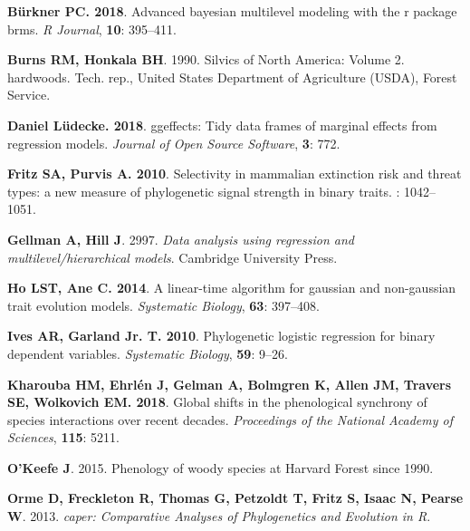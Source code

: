 \documentclass[11pt]{article}\usepackage[]{graphicx}\usepackage[]{color}
\begin{document}
{\begin{thebibliography}{20}
{\bf B{\"u}rkner PC}{\bf . 2018}.
\newblock Advanced bayesian multilevel modeling with the r package brms.
\newblock \emph{R Journal}, {\bf 10}: 395--411.

{\bf Burns RM, Honkala BH}. 1990.
\newblock Silvics of North America: Volume 2. hardwoods.
\newblock Tech. rep., United States Department of Agriculture (USDA), Forest
  Service.

{\bf {Daniel L{\"u}decke}}{\bf . 2018}.
\newblock ggeffects: Tidy data frames of marginal effects from regression
  models.
\newblock \emph{{Journal of Open Source Software}}, {\bf 3}: 772.

{\bf Fritz SA, Purvis A}{\bf . 2010}.
\newblock Selectivity in mammalian extinction risk and threat types: a new
  measure of phylogenetic signal strength in binary traits.
: 1042--1051.

{\bf Gellman A, Hill J}. 2997.
\newblock \emph{Data analysis using regression and multilevel/hierarchical
  models}.
\newblock Cambridge University Press.

{\bf Ho LST, Ane C}{\bf . 2014}.
\newblock A linear-time algorithm for gaussian and non-gaussian trait evolution
  models.
\newblock \emph{Systematic Biology}, {\bf 63}: 397--408.

{\bf Ives AR, Garland Jr. T}{\bf . 2010}.
\newblock Phylogenetic logistic regression for binary dependent variables.
\newblock \emph{Systematic Biology}, {\bf 59}: 9--26.

{\bf Kharouba HM, Ehrl{\'e}n J, Gelman A, Bolmgren K, Allen JM, Travers SE,
  Wolkovich EM}{\bf . 2018}.
\newblock Global shifts in the phenological synchrony of species interactions
  over recent decades.
\newblock \emph{Proceedings of the National Academy of Sciences}, {\bf 115}:
  5211.

{\bf O'Keefe J}. 2015.
\newblock Phenology of woody species at Harvard Forest since 1990.

{\bf Orme D, Freckleton R, Thomas G, Petzoldt T, Fritz S, Isaac N, Pearse W}.
  2013.
\newblock \emph{caper: Comparative Analyses of Phylogenetics and Evolution in
  R}.


\end{thebibliography}}
\end{document}
